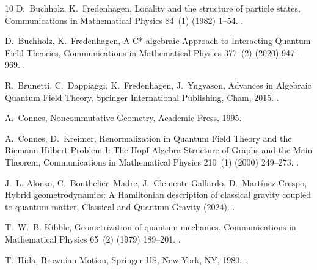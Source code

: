 \documentclass{elsarticle}%
\begin{document}
\begin{thebibliography}{10}
    D.~Buchholz, K.~Fredenhagen, Locality and the structure of particle states, Communications in Mathematical Physics 84~(1) (1982) 1--54.
    \newblock \href {https://doi.org/10.1007/BF01208370} {}.
    
    D.~Buchholz, K.~Fredenhagen, A {{C}}*-algebraic {{Approach}} to {{Interacting Quantum Field Theories}}, Communications in Mathematical Physics 377~(2) (2020) 947--969.
    \newblock \href {https://doi.org/10.1007/s00220-020-03700-9} {}.
    
    R.~Brunetti, C.~Dappiaggi, K.~Fredenhagen, J.~Yngvason, Advances in {{Algebraic Quantum Field Theory}}, Springer International Publishing, Cham, 2015.
    \newblock \href {https://doi.org/10.1007/978-3-319-21353-8} {}.
    
    A.~Connes, Noncommutative {{Geometry}}, Academic Press, 1995.
    
    A.~Connes, D.~Kreimer, Renormalization in {{Quantum Field Theory}} and the {{Riemann-Hilbert Problem I}}: {{The Hopf Algebra Structure}} of {{Graphs}} and the {{Main Theorem}}, Communications in Mathematical Physics 210~(1) (2000) 249--273.
    \newblock \href {https://doi.org/10.1007/s002200050779} {}.
    
    J.~L. Alonso, C.~Bouthelier~Madre, J.~{Clemente-Gallardo}, D.~{Mart{\'i}nez-Crespo}, Hybrid geometrodynamics: {{A Hamiltonian}} description of classical gravity coupled to quantum matter, Classical and Quantum Gravity (2024).
    \newblock \href {https://doi.org/10.1088/1361-6382/ad3459} {}.
    
    T.~W.~B. Kibble, Geometrization of quantum mechanics, Communications in Mathematical Physics 65~(2) (1979) 189--201.
    \newblock \href {https://doi.org/10.1007/BF01225149} {}.
    
    T.~Hida, Brownian {{Motion}}, Springer US, New York, NY, 1980.
    \newblock \href {https://doi.org/10.1007/978-1-4612-6030-1} {}.
    

\end{thebibliography}
\end{document}

